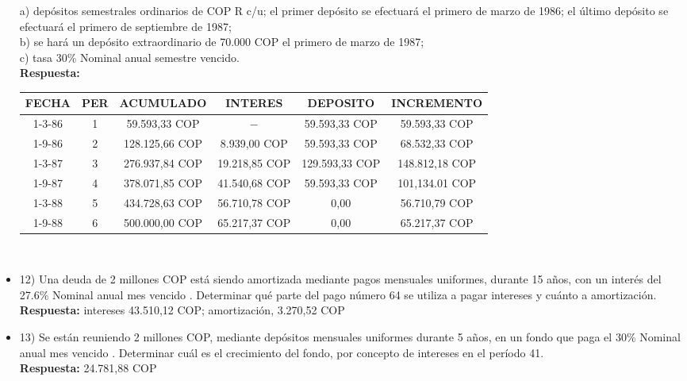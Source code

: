 \begin{itemize}
       a)	depósitos semestrales ordinarios de COP R c/u; el primer depósito se efectuará el primero de marzo de 1986; el último depósito se efectuará el primero de septiembre de 1987; \\
       b)	se hará un depósito extraordinario de 70.000 COP el primero de marzo de 1987;\\
       c)	tasa 30\%  Nominal anual semestre vencido.\\
       \textbf{Respuesta:}
       \begin{center}
            \begin{tabular}{| c | c | c | c | c | c |}
    \hline
    \textbf{FECHA} & \textbf{PER} & \textbf{ACUMULADO} & \textbf{INTERES} & \textbf{DEPOSITO} & \textbf{INCREMENTO}  \\ \hline
    1-3-86  & 1 & 59.593,33 COP & $-$ &  59.593,33 COP & 59.593,33 COP \\ \hline
    1-9-86  & 2 & 128.125,66 COP & 8.939,00 COP & 59.593,33 COP & 68.532,33 COP \\ \hline
    1-3-87  & 3 & 276.937,84 COP & 19.218,85 COP &  129.593,33 COP & 148.812,18 COP  \\ \hline
    1-9-87  & 4 & 378.071,85 COP & 41.540,68 COP &  59.593,33 COP & 101,134.01 COP  \\ \hline
    1-3-88  & 5 & 434.728,63 COP & 56.710,78 COP &  0,00 & 56.710,79 COP  \\ \hline
    1-9-88  & 6 & 500.000,00 COP & 65.217,37 COP &  0,00 & 65.217,37 COP \\ \hline
    \end{tabular}\\
       \end{center}
       \medskip

 \item 12)	 Una deuda de 2 millones COP está siendo amortizada mediante pagos mensuales uniformes, durante 15 años, con un interés del 27.6\%  Nominal anual mes vencido . Determinar qué parte del pago número 64 se utiliza a pagar intereses y cuánto a amortización.\\
       \textbf{ Respuesta:} intereses 43.510,12 COP; amortización, 3.270,52 COP
       \medskip

 \item 13)	 Se están reuniendo 2 millones COP, mediante depósitos mensuales uniformes durante 5 años, en un fondo que paga el 30\%  Nominal anual mes vencido . Determinar cuál es el crecimiento del fondo, por concepto de intereses en el período 41. \\
       \textbf{Respuesta:} 24.781,88 COP
       \medskip


\end{itemize}
